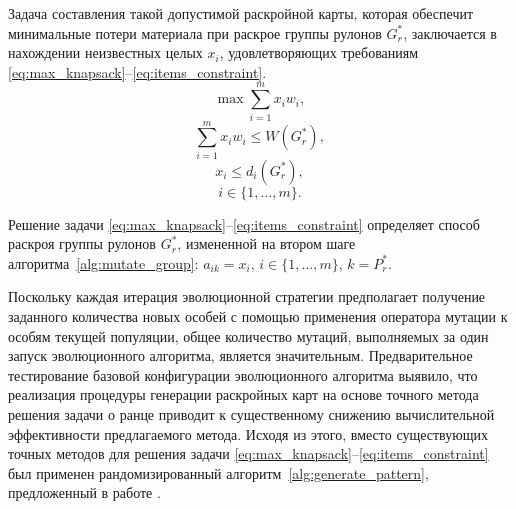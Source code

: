 \documentclass[12pt]{article}
\begin{document}
Задача составления такой допустимой раскройной карты, которая обеспечит 
минимальные потери материала при раскрое группы рулонов $G_r^*$, заключается 
в нахождении неизвестных целых $x_i$, удовлетворяющих требованиям 
\eqref{eq:max_knapsack}--\eqref{eq:items_constraint}.    
\begin{equation}\label{eq:max_knapsack}
    \max{\sum_{i=1}^{m} x_i w_i},
\end{equation}        
\begin{equation}\label{eq:knapsack_constraint}
    \sum_{i=1}^{m} x_i w_i \leq W(G_r^*),
\end{equation}        
\begin{equation}\label{eq:items_constraint}
    x_i \leq d_i(G_r^*),
\end{equation}        
\[ i \in \{1,\ldots,m\}. \]

Решение задачи 
\eqref{eq:max_knapsack}--\eqref{eq:items_constraint} 
определяет способ раскроя группы рулонов $G_r^*$, 
измененной на втором шаге алгоритма~\ref{alg:mutate_group}: 
$a_{ik}=x_i$, $i \in \{1,\ldots,m\}$, $k=P_r^*$.

Поскольку каждая итерация эволюционной стратегии предполагает получение 
заданного количества новых особей с помощью применения оператора мутации к 
особям текущей популяции, общее количество мутаций, выполняемых за один запуск 
эволюционного алгоритма, является значительным. Предварительное тестирование 
базовой конфигурации эволюционного алгоритма выявило, что реализация процедуры 
генерации раскройных карт на основе точного метода решения задачи о ранце 
приводит к существенному снижению вычислительной эффективности предлагаемого 
метода. Исходя из этого, вместо существующих точных методов для решения задачи 
\eqref{eq:max_knapsack}--\eqref{eq:items_constraint} 
был применен рандомизированный алгоритм~\ref{alg:generate_pattern}, 
предложенный в работе 
\cite{vahrenkamp96}. 
\end{document}
